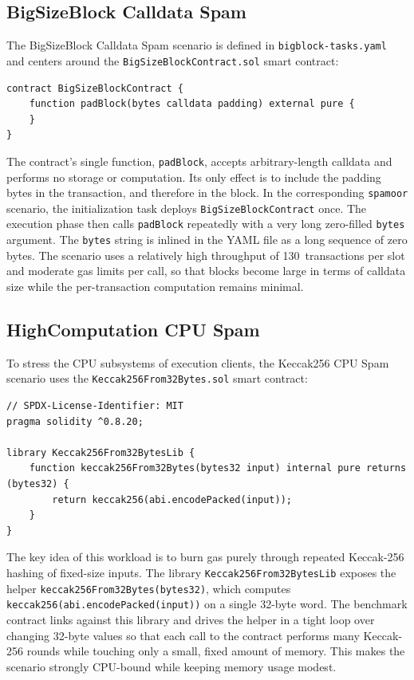 \subsection{BigSizeBlock Calldata Spam}

The BigSizeBlock Calldata Spam scenario is defined in \texttt{bigblock-tasks.yaml} and centers around the \texttt{BigSizeBlockContract.sol} smart contract:

\begin{lstlisting}[caption={BigSizeBlockContract for calldata-filling transactions},label={lst:bigsizeblock-contract}]
contract BigSizeBlockContract {
    function padBlock(bytes calldata padding) external pure {
    }
}
\end{lstlisting}

The contract’s single function, \texttt{padBlock}, accepts arbitrary-length calldata and performs no storage or computation. Its only effect is to include the padding bytes in the transaction, and therefore in the block. In the corresponding \texttt{spamoor} scenario, the initialization task deploys \texttt{BigSizeBlockContract} once. The execution phase then calls \texttt{padBlock} repeatedly with a very long zero-filled \texttt{bytes} argument. The \texttt{bytes} string is inlined in the YAML file as a long sequence of zero bytes. The scenario uses a relatively high throughput of 130~transactions per slot and moderate gas limits per call, so that blocks become large in terms of calldata size while the per-transaction computation remains minimal.

\subsection{HighComputation CPU Spam}

To stress the CPU subsystems of execution clients, the Keccak256 CPU Spam scenario uses the \texttt{Keccak256From32Bytes.sol} smart contract:

\begin{lstlisting}[caption={HighComputeContract for CPU and memory-intensive workload},label={lst:highcompute-contract}]
// SPDX-License-Identifier: MIT
pragma solidity ^0.8.20;

library Keccak256From32BytesLib {
    function keccak256From32Bytes(bytes32 input) internal pure returns (bytes32) {
        return keccak256(abi.encodePacked(input));
    }
}
\end{lstlisting}

The key idea of this workload is to burn gas purely through repeated Keccak-256 hashing of fixed-size inputs. The library \texttt{Keccak256From32BytesLib} exposes the helper \texttt{keccak256From32Bytes(bytes32)}, which computes \texttt{keccak256(abi.encodePacked(input))} on a single 32-byte word. The benchmark contract links against this library and drives the helper in a tight loop over changing 32-byte values so that each call to the contract performs many Keccak-256 rounds while touching only a small, fixed amount of memory. This makes the scenario strongly CPU-bound while keeping memory usage modest.

